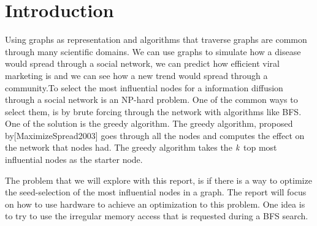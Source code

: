 \chapter{Introduction} 

Using graphs as representation and algorithms that traverse graphs are common through many scientific domains\cite{HybridBFS2015}. We can use graphs to simulate how a disease would spread through a social network, we can predict how efficient viral marketing is and we can see how a new trend would spread through a community\cite{MaximizeSpread2003}.To select the most influential nodes for a information diffusion through a social network is an NP-hard problem\cite{MaximizeSpread2003}. One of the common ways to select them, is by brute forcing through the network with algorithms like BFS. One of the solution is the greedy algorithm\cite{MaximizeSpread2015}. The greedy algorithm, proposed by[MaximizeSpread2003] goes through all the nodes and computes the effect on the network that nodes had. The greedy algorithm takes the $\it{k}$ top most influential nodes as the starter node. 

The problem that we will explore with this report, is if there is a way to optimize the seed-selection of the most influential nodes in a graph. The report will focus on how to use hardware to achieve an optimization to this problem. One idea is to try to use the irregular memory access that is requested during a BFS search. 

